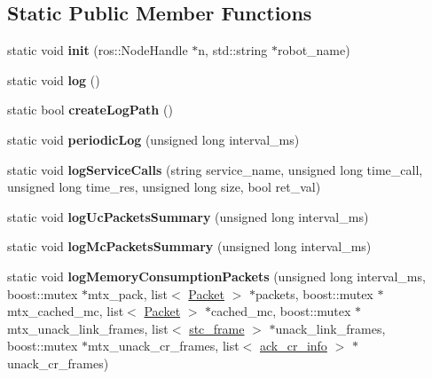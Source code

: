 \subsection*{Static Public Member Functions}
\begin{DoxyCompactItemize}
\item 
\hypertarget{classLogging_ac9b0791fcd34355046bf1efcd8933745}{static void {\bfseries init} (ros\-::\-Node\-Handle $\ast$n, std\-::string $\ast$robot\-\_\-name)}\label{classLogging_ac9b0791fcd34355046bf1efcd8933745}

\item 
\hypertarget{classLogging_a6cf79a044b7916c6178d007f0d594fe0}{static void {\bfseries log} ()}\label{classLogging_a6cf79a044b7916c6178d007f0d594fe0}

\item 
\hypertarget{classLogging_a4cd2926447add5daf884531662eb993d}{static bool {\bfseries create\-Log\-Path} ()}\label{classLogging_a4cd2926447add5daf884531662eb993d}

\item 
\hypertarget{classLogging_a982c4a6bc3fc23aa3176658091398005}{static void {\bfseries periodic\-Log} (unsigned long interval\-\_\-ms)}\label{classLogging_a982c4a6bc3fc23aa3176658091398005}

\item 
\hypertarget{classLogging_aa38b526582aadc2bcbaa902ff649fe65}{static void {\bfseries log\-Service\-Calls} (string service\-\_\-name, unsigned long time\-\_\-call, unsigned long time\-\_\-res, unsigned long size, bool ret\-\_\-val)}\label{classLogging_aa38b526582aadc2bcbaa902ff649fe65}

\item 
\hypertarget{classLogging_a5e47b73b1b05a77250cfcd04343d5aa3}{static void {\bfseries log\-Uc\-Packets\-Summary} (unsigned long interval\-\_\-ms)}\label{classLogging_a5e47b73b1b05a77250cfcd04343d5aa3}

\item 
\hypertarget{classLogging_a2280c78af5eed664108d355b7c640a0f}{static void {\bfseries log\-Mc\-Packets\-Summary} (unsigned long interval\-\_\-ms)}\label{classLogging_a2280c78af5eed664108d355b7c640a0f}

\item 
\hypertarget{classLogging_ad9f61b6c59f4b254d57fbdc5224c0637}{static void {\bfseries log\-Memory\-Consumption\-Packets} (unsigned long interval\-\_\-ms, boost\-::mutex $\ast$mtx\-\_\-pack, list$<$ \hyperlink{classPacket}{Packet} $>$ $\ast$packets, boost\-::mutex $\ast$mtx\-\_\-cached\-\_\-mc, list$<$ \hyperlink{classPacket}{Packet} $>$ $\ast$cached\-\_\-mc, boost\-::mutex $\ast$mtx\-\_\-unack\-\_\-link\-\_\-frames, list$<$ \hyperlink{structstc__frame}{stc\-\_\-frame} $>$ $\ast$unack\-\_\-link\-\_\-frames, boost\-::mutex $\ast$mtx\-\_\-unack\-\_\-cr\-\_\-frames, list$<$ \hyperlink{structack__cr__info}{ack\-\_\-cr\-\_\-info} $>$ $\ast$unack\-\_\-cr\-\_\-frames)}\label{classLogging_ad9f61b6c59f4b254d57fbdc5224c0637}


\end{DoxyCompactItemize}
